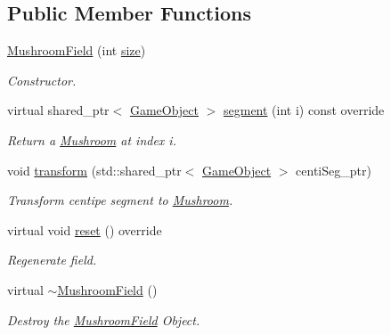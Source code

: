 \subsection*{Public Member Functions}
\begin{DoxyCompactItemize}
\item 
\mbox{\hyperlink{class_mushroom_field_af2fe64e9f63e8fcec6a5bbae644de4cb}{Mushroom\+Field}} (int \mbox{\hyperlink{class_game_object_container_a4502e18e58c774b681e7ef8e6319910d}{size}})
\begin{DoxyCompactList}\small\item\em Constructor. \end{DoxyCompactList}\item 
virtual shared\+\_\+ptr$<$ \mbox{\hyperlink{class_game_object}{Game\+Object}} $>$ \mbox{\hyperlink{class_mushroom_field_a478cc3df9deaf0e7a0b48fd2d128eeb8}{segment}} (int i) const override
\begin{DoxyCompactList}\small\item\em Return a \mbox{\hyperlink{class_mushroom}{Mushroom}} at index i. \end{DoxyCompactList}\item 
void \mbox{\hyperlink{class_mushroom_field_aa182f3e0d33fccac34c7237e7994ecb7}{transform}} (std\+::shared\+\_\+ptr$<$ \mbox{\hyperlink{class_game_object}{Game\+Object}} $>$ centi\+Seg\+\_\+ptr)
\begin{DoxyCompactList}\small\item\em Transform centipe segment to \mbox{\hyperlink{class_mushroom}{Mushroom}}. \end{DoxyCompactList}\item 
\mbox{\label{class_mushroom_field_a244cff4ad63184c6c41e1e4bac007a2a}} 
virtual void \mbox{\hyperlink{class_mushroom_field_a244cff4ad63184c6c41e1e4bac007a2a}{reset}} () override
\begin{DoxyCompactList}\small\item\em Regenerate field. \end{DoxyCompactList}\item 
\mbox{\label{class_mushroom_field_ac3918d58b61d0f51e851cb02964f0d73}} 
virtual \mbox{\hyperlink{class_mushroom_field_ac3918d58b61d0f51e851cb02964f0d73}{$\sim$\+Mushroom\+Field}} ()
\begin{DoxyCompactList}\small\item\em Destroy the \mbox{\hyperlink{class_mushroom_field}{Mushroom\+Field}} Object. \end{DoxyCompactList}\end{DoxyCompactItemize}
